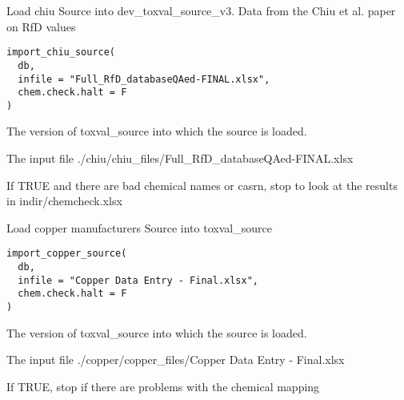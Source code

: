 \documentclass[letterpaper]{book}
\begin{document}
%
\begin{Description}\relax
Load chiu Source into dev\_toxval\_source\_v3.
Data from the Chiu et al. paper on RfD values
\end{Description}
%
\begin{Usage}
\begin{verbatim}
import_chiu_source(
  db,
  infile = "Full_RfD_databaseQAed-FINAL.xlsx",
  chem.check.halt = F
)
\end{verbatim}
\end{Usage}
%
\begin{Arguments}
\begin{ldescription}
\item[\code{db}] The version of toxval\_source into which the source is loaded.

\item[\code{infile}] The input file ./chiu/chiu\_files/Full\_RfD\_databaseQAed-FINAL.xlsx

\item[\code{chem.check.halt}] If TRUE and there are bad chemical names or casrn,
stop to look at the results in indir/chemcheck.xlsx
\end{ldescription}
\end{Arguments}
%
\begin{Description}\relax
Load copper manufacturers Source into toxval\_source
\end{Description}
%
\begin{Usage}
\begin{verbatim}
import_copper_source(
  db,
  infile = "Copper Data Entry - Final.xlsx",
  chem.check.halt = F
)
\end{verbatim}
\end{Usage}
%
\begin{Arguments}
\begin{ldescription}
\item[\code{db}] The version of toxval\_source into which the source is loaded.

\item[\code{infile}] The input file ./copper/copper\_files/Copper Data Entry - Final.xlsx

\item[\code{chem.check.halt}] If TRUE, stop if there are problems with the chemical mapping
\end{ldescription}
\end{Arguments}
\end{document}
